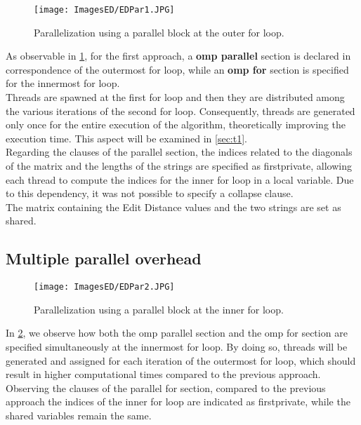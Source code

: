 \documentclass[10pt,twocolumn,letterpaper]{article}
\begin{document}
\begin{figure}[h]
    \centering
    \texttt{[image: ImagesED/EDPar1.JPG]}
    \caption{Parallelization using a parallel block at the outer for loop.}
    \label{fig:par1}
\end{figure}

As observable in \cref{fig:par1}, for the first approach, a \textbf{omp parallel} section is declared in correspondence of the outermost for loop, while an \textbf{omp for} section is specified for the innermost for loop.\\
Threads are spawned at the first for loop and then they are distributed among the various iterations of the second for loop. Consequently, threads are generated only once for the entire execution of the algorithm, theoretically improving the execution time. This aspect will be examined in \cref{sec:t1}.\\
Regarding the clauses of the parallel section, the indices related to the diagonals of the matrix and the lengths of the strings are specified as firstprivate, allowing each thread to compute the indices for the inner for loop in a local variable. Due to this dependency, it was not possible to specify a collapse clause.\\
The matrix containing the Edit Distance values and the two strings are set as shared.

\subsection{Multiple parallel overhead}

\begin{figure}[h]
    \centering
    \texttt{[image: ImagesED/EDPar2.JPG]}
    \caption{Parallelization using a parallel block at the inner for loop.}
    \label{fig:par2}
\end{figure}

In \cref{fig:par2}, we observe how both the omp parallel section and the omp for section are specified simultaneously at the innermost for loop. By doing so, threads will be generated and assigned for each iteration of the outermost for loop, which should result in higher computational times compared to the previous approach.\\
Observing the clauses of the parallel for section, compared to the previous approach the indices of the inner for loop are indicated as firstprivate, while the shared variables remain the same.
\end{document}
